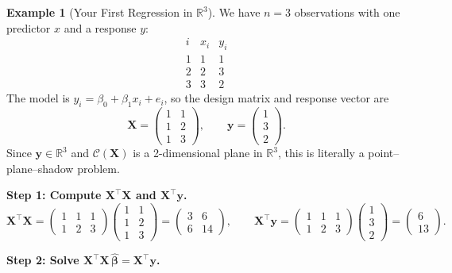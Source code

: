 \documentclass[11pt,a4paper]{article}
\theoremstyle{plain}
\theoremstyle{definition}
\newtheorem{example}[theorem]{Example}
\newcommand{\R}{\mathbb{R}}
\newcommand{\bhat}{\hat{\bm{\beta}}}
\newcommand{\bX}{\bm{X}}
\newcommand{\by}{\bm{y}}
\newcommand{\Col}{\mathcal{C}}
\begin{document}
\begin{example}[Your First Regression in $\R^3$]\label{ex:first-regression}
We have $n=3$ observations with one predictor $x$ and a response $y$:
\[
\begin{array}{c|cc}
i & x_i & y_i \\\hline
1 & 1 & 1 \\
2 & 2 & 3 \\
3 & 3 & 2
\end{array}
\]
The model is $y_i = \beta_0 + \beta_1 x_i + e_i$, so the design matrix and response vector are
\[
\bX = \begin{pmatrix} 1 & 1 \\ 1 & 2 \\ 1 & 3 \end{pmatrix}, \qquad
\by = \begin{pmatrix} 1 \\ 3 \\ 2 \end{pmatrix}.
\]
Since $\by\in\R^3$ and $\Col(\bX)$ is a 2-dimensional plane in $\R^3$,
this is literally a point--plane--shadow problem.

\medskip\noindent\textbf{Step 1: Compute $\bX^\top\bX$ and $\bX^\top\by$.}
\[
\bX^\top\bX
= \begin{pmatrix} 1 & 1 & 1 \\ 1 & 2 & 3 \end{pmatrix}
  \begin{pmatrix} 1 & 1 \\ 1 & 2 \\ 1 & 3 \end{pmatrix}
= \begin{pmatrix} 3 & 6 \\ 6 & 14 \end{pmatrix},
\qquad
\bX^\top\by
= \begin{pmatrix} 1 & 1 & 1 \\ 1 & 2 & 3 \end{pmatrix}
  \begin{pmatrix} 1 \\ 3 \\ 2 \end{pmatrix}
= \begin{pmatrix} 6 \\ 13 \end{pmatrix}.
\]

\medskip\noindent\textbf{Step 2: Solve $\bX^\top\bX\,\bhat = \bX^\top\by$.}


\end{example}
\end{document}
